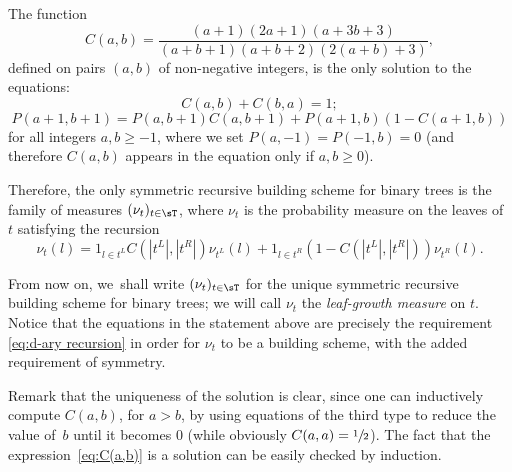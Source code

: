 \begin{thm}\label{thm:defmeasurediscrete}The function
\begin{equation}\label{eq:C(a,b)}C(a,b)=\frac{(a+1)(2a+1)(a+3b+3)}{(a+b+1)(a+b+2)(2(a+b)+3)},\end{equation}
defined on pairs $(a,b)$ of non-negative integers, is the only solution to the equations:
\[
C(a,b)+C(b,a)=1;
\]
\[
P(a+1,b+1)=P(a,b+1)C(a,b+1)+P(a+1,b)(1-C(a+1,b))
\]
for all integers $a,b\geq -1$, where we set $P(a,-1)=P(-1,b)=0$ (and therefore $C(a,b)$ appears in the equation only if $a,b\geq 0$).

Therefore, the only symmetric recursive building scheme for binary trees is the family of measures $(\nu_t)_{t\in \sT}$, where $\nu_t$ is the probability measure on the leaves of $t$ satisfying the recursion
\begin{equation}\nu_t(l)=1_{l\in t^L}C(|t^L|,|t^R|)\nu_{t^L}(l)+1_{l\in t^R}(1-C(|t^L|,|t^R|))\nu_{t^R}(l).\label{recursion with C's}\end{equation}
\end{thm}

From now on, we~shall write $(\nu_t)_{t\in \sT}$ for the unique symmetric recursive building scheme for binary trees; we will call $\nu_t$ the \emph{leaf-growth measure} on $t$. Notice that the equations in the statement above are precisely the requirement \eqref{eq:d-ary recursion} in order for $\nu_t$ to be a building scheme, with the added requirement of symmetry.

Remark that the uniqueness of the solution is clear, since one can inductively compute $C(a,b)$, for $a>b$, by using equations of the third type to reduce the value of~$b$ until it becomes $0$ (while obviously $C(a,a)=\sfrac12$). The fact that the expression~\eqref{eq:C(a,b)} is a solution can be easily checked by induction.

